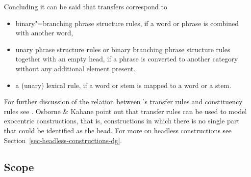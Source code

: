 Concluding it can be said that transfers correspond to 
\begin{itemize}
\item binary"=branching phrase structure rules,
if a word or phrase is combined with another word, 
\item unary phrase structure rules or binary branching phrase structure rules together with an empty head, if
  a phrase is converted to another category without any additional element present.
\item a (unary) lexical rule, if a word or stem is mapped to a word or a stem.
\end{itemize}
For further discussion of the relation between \tes's transfer rules and constituency rules see
. Osborne \& Kahane point out that transfer rules can be used
to model exocentric constructions, that is, constructions in which there is no single part that
could be identified as the head. For more on headless constructions see Section~\ref{sec-headless-constructions-dg}.

\subsection{Scope}

